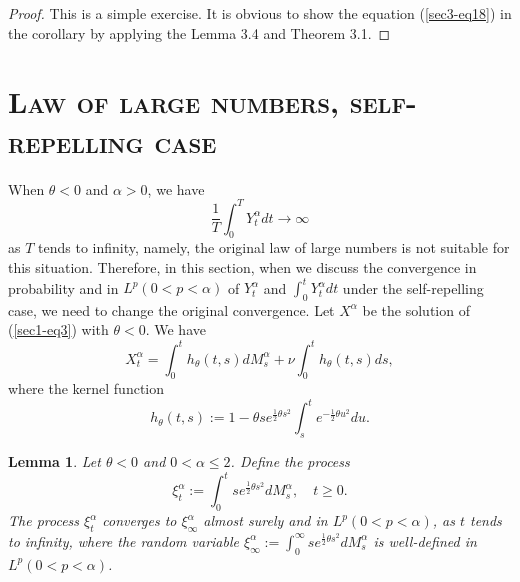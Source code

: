 \documentclass[11pt]{amsart}
\theoremstyle{plain}
\newtheorem{lemma}{Lemma}[section]
\numberwithin{equation}{section}
\begin{document}
\begin{proof}
This is a simple exercise. It is obvious to show the equation (\ref{sec3-eq18}) in the corollary  by applying the Lemma 3.4 and Theorem 3.1.
\end{proof}

\section{\textsc{Law of large numbers, self-repelling case}}
When $\theta<0$ and $\alpha>0$, we have
$$
\frac{1}{T}\int_0^T Y_t^\alpha dt \longrightarrow \infty
$$
as $T$ tends to infinity, namely, the original law of large numbers is not suitable for this situation. Therefore, in this section, when we discuss the convergence in probability and in $L^p(0<p<\alpha)$ of $Y_t^\alpha$ and $\int_0^t Y_t^\alpha dt$ under the self-repelling case, we need to change the original convergence. Let $X^\alpha$ be the solution of (\ref{sec1-eq3}) with $\theta<0$. We have
$$
X_t^\alpha=\int_0^t h_\theta(t,s)dM_s^\alpha+\nu\int_0^t h_\theta(t,s)ds,
$$
where the kernel function
$$
h_\theta(t,s):=1-\theta se^{\frac{1}{2}\theta s^2}\int_s^t e^{-\frac{1}{2}\theta u^2}du.
$$

\begin{lemma}
Let $\theta<0$ and $0<\alpha\leq 2$. Define the process
$$
\xi_t^\alpha :=\int_0^t se^{\frac{1}{2}\theta s^2}dM_s^\alpha,\quad t\geq 0.
$$
The process $\xi_t^\alpha$ converges to $\xi_\infty^\alpha$ almost surely and in $L^p(0<p<\alpha)$, as $t$ tends to infinity, where the random variable $\xi_\infty^\alpha:=\int_0^\infty se^{\frac{1}{2}\theta s^2}dM_s^\alpha$ is well-defined in $L^p (0<p<\alpha)$.
\end{lemma}
\end{document}

